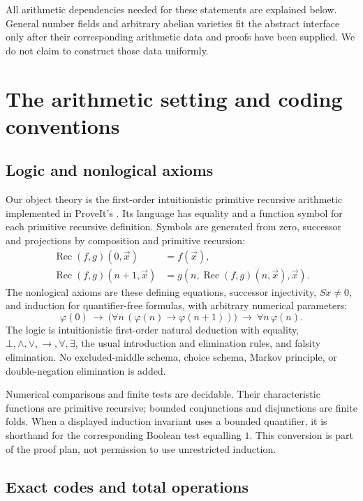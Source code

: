 All arithmetic dependencies needed for these statements are explained
below. General number fields and arbitrary abelian varieties fit the
abstract interface only after their corresponding arithmetic data and
proofs have been supplied. We do not claim to construct those data
uniformly.

\section{The arithmetic setting and coding conventions}
\label{sec:foundations}

\subsection{Logic and nonlogical axioms}

Our object theory is the first-order intuitionistic primitive recursive
arithmetic implemented in ProveIt's 
\cite{proveit}. Its language has equality and a function symbol for each
primitive recursive definition. Symbols are generated from zero,
successor and projections by composition and primitive recursion:
\[
\begin{split}
 \operatorname{Rec}(f,g)(0,\vec x)&=f(\vec x),\\
 \operatorname{Rec}(f,g)(n+1,\vec x)
   &=g(n,\operatorname{Rec}(f,g)(n,\vec x),\vec x).
\end{split}
\]
The nonlogical axioms are these defining equations, successor injectivity,
$Sx\ne0$, and induction for quantifier-free formulas, with arbitrary
numerical parameters:
\[
 \varphi(0)\ \to\
 \bigl(\forall n\,(\varphi(n)\to\varphi(n+1))\bigr)
 \ \to\ \forall n\,\varphi(n).
 \tag{2.1}\label{eq:qfind}
\]
The logic is intuitionistic first-order natural deduction with equality,
$\bot,\wedge,\vee,\to,\forall,\exists$, the usual introduction and
elimination rules, and falsity elimination. No excluded-middle schema,
choice schema, Markov principle, or double-negation elimination is added.

Numerical comparisons and finite tests are decidable. Their characteristic
functions are primitive recursive; bounded conjunctions and disjunctions
are finite folds. When a displayed induction invariant uses a bounded
quantifier, it is shorthand for the corresponding Boolean test equalling
$1$. This conversion is part of the proof plan, not permission to use
unrestricted induction.

\subsection{Exact codes and total operations}

